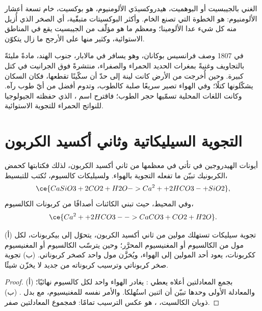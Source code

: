  الغني بالجيبسيت أو البوهميت، هيدروكسيدَي الألومنيوم، هو بوكسيت، خام تسعة أعشار الألومنيوم:  هو الخطوة التي تصنع الخام. وأكثر البوكسيتات متبقّية، أي الصخر الذي أُزيل منه كل شيء عدا الألومينا؛ ومعظم ما هو مؤلّف من الجيبسيت يقع في المناطق الاستوائية، وكثير منها على الأرجح ما زال يتكوّن.

\begin{history}
في 1807 وصف فرانسيس بوكانان، وهو يسافر في مالابار، جنوب الهند، مادةً مليئةً بالتجاويف وغنيةً بمغرات الحديد الحمراء والصفراء، منتشرةً فوق الجرانيت في كتل كبيرة. وحين أُخرجت من الأرض كانت لينة إلى حدّ أن سكّينًا تقطعها، فكان السكان يشكّلونها كتلًا؛ وفي الهواء تصير سريعًا صلبة كالطوب، وتدوم أفضل من أيّ طوب رآه. وكانت اللغات المحلية تسمّيها حجر الطوب؛ فاقترح اسم ، الذي حفظته الجيولوجيا للنواتج الحمراء للتجوية الاستوائية.
\end{history}

\section{التجوية السيليكاتية وثاني أكسيد الكربون}\label{sec:b1:weathering-clays:co2}

أيونات الهيدروجين في  تأتي في معظمها من ثاني أكسيد الكربون، لذلك فكتابتها كحمض الكربونيك تبيّن ما تفعله التجوية بالهواء. ولسيليكات كالسيوم، تُكتب  للتبسيط،
\[
  \ce{CaSiO3 + 2 CO2 + H2O -> Ca^2+ + 2 HCO3- + SiO2},
\]
وفي المحيط، حيث تبني الكائنات أصدافًا من كربونات الكالسيوم،
\[
  \ce{Ca^2+ + 2 HCO3- -> CaCO3 + CO2 + H2O}.
\]

\begin{proposition}\label{prop:b1:weathering-clays:co2}
(أ) تجوية سيليكات تستهلك مولين من ثاني أكسيد الكربون، يتحوّل إلى بيكربونات، لكل مول من الكالسيوم أو المغنيسيوم المحرَّر؛ وحين يترسّب الكالسيوم أو المغنيسيوم ككربونات، يعود أحد المولين إلى الهواء، ويُخزَّن مول واحد كصخر كربوناتي. (ب) تجوية صخر كربوناتي وترسيب كربوناته من جديد لا يخزّن شيئًا.
\end{proposition}

\begin{proof}
(أ) بجمع المعادلتين أعلاه يعطي : يغادر الهواء  واحد لكل كالسيوم نهائيًا؛ والمعادلة الأولى وحدها تبيّن أن اثنين استُهلكا. والأمر نفسه للمغنيسيوم، مع  بدل . (ب) ذوبان الكالسيت، ، هو عكس الترسيب تمامًا: فمجموع المعادلتين صفر.
\end{proof}

